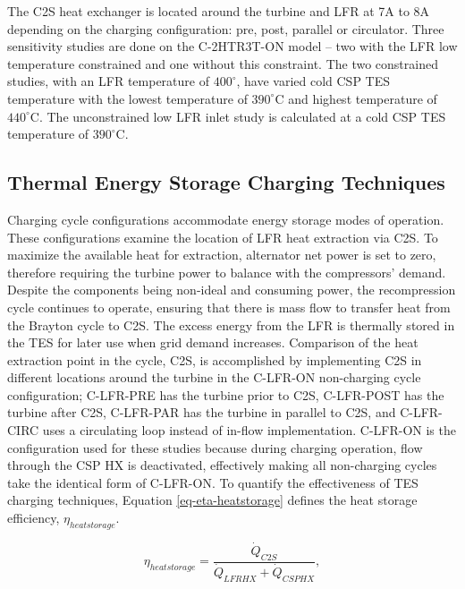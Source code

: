 \begin{paracol}{2}
\linenumbers
\switchcolumn

The C2S heat exchanger is located around the turbine and LFR at 7A to 8A depending on the charging configuration: pre, post, parallel or circulator. Three sensitivity studies are done on the C-2HTR3T-ON model -- two with the LFR low temperature constrained and one without this constraint. The two constrained studies, with an LFR temperature of $400^{\circ}$, have varied cold CSP TES temperature with the lowest temperature of $390^{\circ}$C and highest temperature of $440^{\circ}$C. The unconstrained low LFR inlet study is calculated at a cold CSP TES temperature of $390^{\circ}$C.



\subsection{Thermal Energy Storage Charging Techniques} 

Charging cycle configurations accommodate energy storage modes of operation. These configurations examine the location of LFR heat extraction via C2S. To maximize the available heat for extraction, alternator net power is set to zero, therefore requiring the turbine power to balance with the compressors' demand. Despite the components being non-ideal and consuming power, the recompression cycle continues to operate, ensuring that there is mass flow to transfer heat from the Brayton cycle to C2S. The excess energy from the LFR is thermally stored in the TES for later use when grid demand increases. Comparison of the heat extraction point in the cycle, C2S, is accomplished by implementing C2S in different locations around the turbine in the C-LFR-ON non-charging cycle configuration; C-LFR-PRE has the turbine prior to C2S, C-LFR-POST has the turbine after C2S, C-LFR-PAR has the turbine in parallel to C2S, and C-LFR-CIRC uses a circulating loop instead of in-flow implementation. C-LFR-ON is the configuration used for these studies because during charging operation, flow through the CSP HX is deactivated, effectively making all non-charging cycles take the identical form of C-LFR-ON. To quantify the effectiveness of TES charging techniques, Equation \ref{eq-eta-heatstorage} defines the heat storage efficiency, $\eta_{heatstorage}$.  

\begin{equation}
    \label{eq-eta-heatstorage}
    \eta_{heatstorage} = \frac{\dot{Q}_{C2S}}{\dot{Q}_{LFRHX}+\dot{Q}_{CSPHX}},
\end{equation}


\end{paracol}
